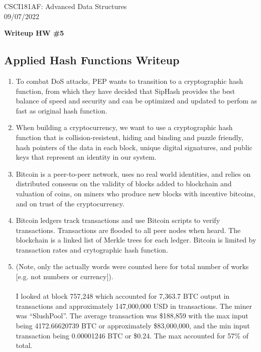 \documentclass[11pt]{article}
\begin{document}
CSCI181AF: Advanced Data Structures\\
09/07/2022
\begin{center}
    \bf{Writeup HW \#5}
\end{center}
\subsection*{Applied Hash Functions Writeup}
\begin{enumerate}
    \item To combat DoS attacks, PEP wants to transition to a cryptographic hash function, from which they have decided that SipHash provides the best balance of speed and security and can be optimized and updated to perfom as fast as original hash function.
    \item When building a cryptocurrency, we want to use a cryptographic hash function that is collision-resistent, hiding and binding and puzzle friendly, hash pointers of the data in each block, unique digital signatures, and public keys that represent an identity in our system.
    \item Bitcoin is a peer-to-peer network, uses no real world identities, and relies on distributed consesus on the validity of blocks added to blockchain and valuation of coins, on miners who produce new blocks with incentive bitcoins, and on trust of the cryptocurrency.
    \item Bitcoin ledgers track transactions and use Bitcoin scripts to verify transactions. Transactions are flooded to all peer nodes when heard. The blockchain is a linked list of Merkle trees for each ledger. Bitcoin is limited by transaction rates and crytographic hash function.
    \item (Note, only the actually words were counted here for total number of works [e.g. not numbers or currency]).\\\\ I looked at block 757,248 which accounted for 7,363.7 BTC output in transactions and approximately 147,000,000 USD in transactions. The miner was “SlushPool”. The average transaction was \$188,859 with the max input being 4172.66620739 BTC or approximately \$83,000,000, and the min input transaction being 0.00001246 BTC or \$0.24. The max accounted for 57\% of total.
\end{enumerate}
\end{document}
